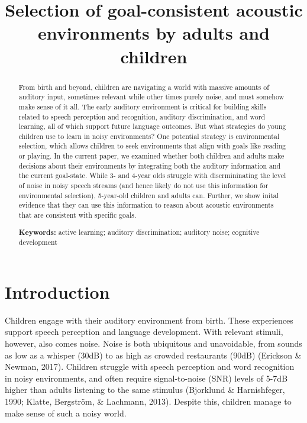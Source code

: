 \documentclass[10pt, letterpaper]{article}
\title{Selection of goal-consistent acoustic environments by adults and
children}
\begin{document}
\maketitle

\begin{abstract}
From birth and beyond, children are navigating a world with massive
amounts of auditory input, sometimes relevant while other times purely
noise, and must somehow make sense of it all. The early auditory
environment is critical for building skills related to speech perception
and recognition, auditory discrimination, and word learning, all of
which support future language outcomes. But what strategies do young
children use to learn in noisy environments? One potential strategy is
environmental selection, which allows children to seek environments that
align with goals like reading or playing. In the current paper, we
examined whether both children and adults make decisions about their
environments by integrating both the auditory information and the
current goal-state. While 3- and 4-year olds struggle with
discrmininating the level of noise in noisy speech streams (and hence
likely do not use this information for environmental selection),
5-year-old children and adults can. Further, we show inital evidence
that they can use this information to reason about acoustic environments
that are consistent with specific goals.

\textbf{Keywords:}
active learning; auditory discrimination; auditory noise; cognitive
development
\end{abstract}

\hypertarget{introduction}{%
\section{Introduction}\label{introduction}}

Children engage with their auditory environment from birth. These
experiences support speech perception and language development. With
relevant stimuli, however, also comes noise. Noise is both ubiquitous
and unavoidable, from sounds as low as a whisper (30dB) to as high as
crowded restaurants (90dB) (Erickson \& Newman, 2017). Children struggle
with speech perception and word recognition in noisy environments, and
often require signal-to-noise (SNR) levels of 5-7dB higher than adults
listening to the same stimulus (Bjorklund \& Harnishfeger, 1990; Klatte,
Bergström, \& Lachmann, 2013). Despite this, children manage to make
sense of such a noisy world.
\end{document}
